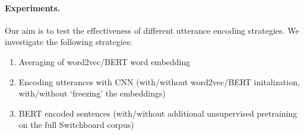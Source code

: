\documentclass[11pt,a4paper,headings=standardclasses]{article}
\begin{document}
%




\paragraph{Experiments.}
Our aim is to test the effectiveness of different utterance encoding strategies. We investigate the following strategies:
\begin{enumerate}
  \item Averaging of word2vec/BERT word embedding
  \item Encoding utterances with CNN (with/without word2vec/BERT initalization, with/without `freezing' the embeddings)
  \item BERT encoded sentences (with/without additional unsupervised pretraining on the full Switchboard corpus)
  \end{enumerate}
\end{document}
